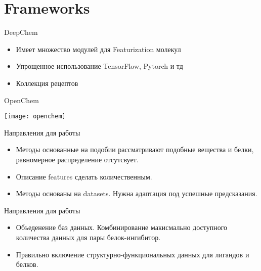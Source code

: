 \section{Frameworks}

\begin{frame}{DeepChem}
    
    \begin{itemize}
        \item Имеет множество модулей для Featurization  молекул 
        \item Упрощенное использование TensorFlow, Pytorch и тд
        \item Коллекция рецептов
    \end{itemize}
\end{frame}

\begin{frame}{OpenChem}

    \texttt{[image: openchem]}
\end{frame}

\begin{frame}{Направления для работы}
    \begin{itemize}
        \item Методы основанные на подобии рассматривают подобные вещества и белки, равномерное распределение отсутсвует.
            \vspace{.2cm}
        \item Описание features сделать количественным.
            \vspace{.2cm}
        \item Методы основаны на datasets. Нужна адаптация под успешные предсказания.
        \end{itemize}
\end{frame}

\begin{frame}{Направления для работы}
    \begin{itemize}
        \item Объеденение баз данных. Комбинирование макисмально доступного количества данных для пары белок-ингибитор.
            \vspace{.2cm}
        \item Правильно включение структурно-функциональных  данных для лигандов и белков.
            \vspace{.2cm}
        \end{itemize}
\end{frame}
